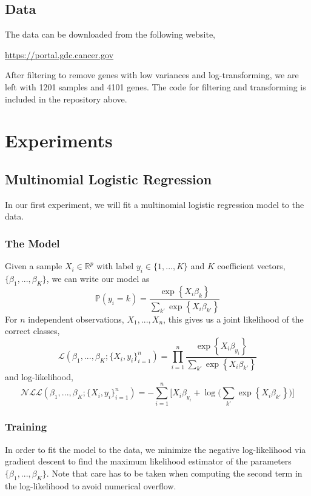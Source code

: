 \documentclass{article}
\begin{document}
\subsection{Data}
The data can be downloaded from the following website,
\begin{center}
\url{https://portal.gdc.cancer.gov}
\end{center}
After filtering to remove genes with low variances and log-transforming, we are left with 1201 samples and 4101 genes. The code for filtering and transforming is included in the repository above.

\section{Experiments}
\label{experiments}

\subsection{Multinomial Logistic Regression}
In our first experiment, we will fit a multinomial logistic regression model to the data. 
\subsubsection{The Model}
Given a sample $X_i \in \mathbb{R}^p$ with label $y_i \in \{1, ..., K\}$ and $K$ coefficient vectors, $\{\beta_1, ..., \beta_K\}$, we can write our model as
\[ \mathbb{P}(y_i = k) = \frac{\exp\left\{X_i\beta_k\right\}}{\sum_{k'} \exp\left\{X_i\beta_{k'}\right\}} \]
For $n$ independent observations, $X_1, ..., X_n$, this gives us a joint likelihood of the correct classes,
\[ \mathcal{L}(\beta_1, ..., \beta_K; \{X_i, y_i\}_{i=1}^n) = \prod\limits_{i=1}^n \frac{\exp\left\{X_i \beta_{y_i}\right\}}{\sum_{k'} \exp\left\{X_i \beta_{k'}\right\}} \]
and log-likelihood,
\[ \mathcal{NLL}(\beta_1, ..., \beta_K; \{X_i, y_i\}_{i=1}^n) = -\sum\limits_{i=1}^n\bigg[ X_i \beta_{y_i} + \log\bigg(\sum\limits_{k'} \exp\left\{X_i \beta_{k'}\right\}\bigg)\bigg] \]
\subsubsection{Training}
In order to fit the model to the data, we minimize the negative log-likelihood via gradient descent to find the maximum likelihood estimator of the parameters $\{\beta_1, ..., \beta_K\}$. Note that care has to be taken when computing the second term in the log-likelihood to avoid numerical overflow.
\end{document}
